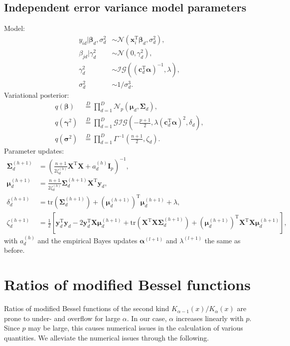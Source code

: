 \documentclass[a4paper,hidelinks]{article}\usepackage[]{graphicx}\usepackage[]{color}
\newcommand{\y}{\mathbf{y}}
\newcommand{\X}{\mathbf{X}}
\newcommand{\x}{\mathbf{x}}
\newcommand{\I}{\mathbf{I}}
\newcommand{\0}{\bm{0}}
\newcommand{\tr}{^{\text{T}}}
\newcommand{\trace}{\text{tr}}
\renewcommand{\(}{\left(}
\renewcommand{\)}{\right)}
\renewcommand{\[}{\left[}
\renewcommand{\]}{\right]}
\begin{document}
\begin{appendix}
		\subsection{Independent error variance model parameters}
		Model:
		\begin{align*}
		y_{id} | \bm{\beta}_d, \sigma_d^2 & \sim \mathcal{N} (\x_i \tr \bm{\beta}_d, \sigma_d^2), \\
		\beta_{jd} | \gamma_d^2 & \sim \mathcal{N} (0, \gamma_d^2), \\
		\gamma_d^2 & \sim \mathcal{IG}((\mathbf{c}_d \tr \bm{\alpha})^{-1}, \lambda), \\
		\sigma_d^2 & \sim 1/\sigma_d^3.
		\end{align*}
		Variational posterior:
		\begin{align*}
		q(\bm{\beta}) & \overset{D}{=} \prod_{d=1}^D \mathcal{N}_p (\bm{\mu}_d, \bm{\Sigma}_d), \\
		q(\bm{\gamma}^2) & \overset{D}{=} \prod_{d=1}^D \mathcal{GIG}\(-\frac{p+1}{2}, \lambda (\mathbf{c}_d \tr \bm{\alpha})^2, \delta_d\), \\
		q(\bm{\sigma}^2) & \overset{D}{=} \prod_{d=1}^D \Gamma^{-1} \(\frac{n + 1}{2}, \zeta_d\).
		\end{align*}
		Parameter updates:
		\begin{align*}
		\bm{\Sigma}_d^{(h+1)} & = \(\frac{n+1}{2 \zeta_d^{(h)}}\X \tr \X + a_d^{(h)} \I_p\)^{-1}, \\
		\bm{\mu}_d^{(h+1)} & = \frac{n+1}{2 \zeta_d^{(h)}} \bm{\Sigma}_d^{(h+1)} \X \tr \y_d, \\
		\delta_d^{(h+1)} & = \trace(\bm{\Sigma}_d^{(h+1)}) + (\bm{\mu}_d^{(h+1)}) \tr \bm{\mu}_d^{(h+1)} + \lambda, \\ \zeta_d^{(h+1)} & = \frac{1}{2} \[\mathbf{y}_d \tr \mathbf{y}_d -2 \mathbf{y}_d \tr \X \bm{\mu}_d^{(h+1)} + \trace (\X \tr \X \bm{\Sigma}_d^{(h+1)}) + (\bm{\mu}_d^{(h+1)}) \tr \X \tr \X \bm{\mu}_d^{(h+1)}\],
		\end{align*}
		with $a_d^{(h)}$ and the empirical Bayes updates $\bm{\alpha}^{(l+1)}$ and $\lambda^{(l+1)}$ the same as before.
		\section{Ratios of modified Bessel functions}
		Ratios of modified Bessel functions of the second kind $K_{\alpha - 1}(x)/K_{\alpha}(x)$ are prone to under- and overflow for large $\alpha$. In our case, $\alpha$ increases linearly with $p$. Since $p$ may be large, this causes numerical issues in the calculation of various quantities. We alleviate the numerical issues through the following.
		

\end{appendix}
\end{document}
